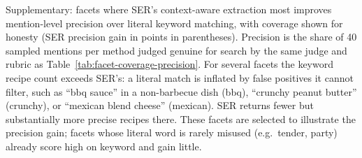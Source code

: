 \begin{table}[t]
\caption{Supplementary: facets where SER's context-aware extraction most improves mention-level precision over literal keyword matching, with coverage shown for honesty (SER precision gain in points in parentheses). Precision is the share of 40 sampled mentions per method judged genuine for search by the same judge and rubric as Table~\ref{tab:facet-coverage-precision}. For several facets the keyword recipe count exceeds SER's: a literal match is inflated by false positives it cannot filter, such as ``bbq sauce'' in a non-barbecue dish (bbq), ``crunchy peanut butter'' (crunchy), or ``mexican blend cheese'' (mexican). SER returns fewer but substantially more precise recipes there. These facets are selected to illustrate the precision gain; facets whose literal word is rarely misused (e.g.\ tender, party) already score high on keyword and gain little.}
\label{tab:precision-wins}
\end{table}
